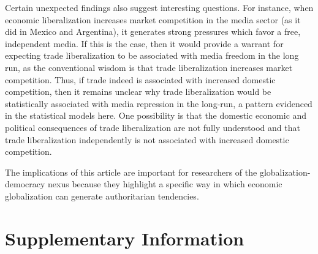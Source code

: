 \documentclass[12pt,a4paper]{article}\usepackage[]{graphicx}\usepackage[]{color}
\begin{document}
Certain unexpected findings also suggest interesting questions. For instance, when economic liberalization increases market competition in the media sector (as it did in Mexico and Argentina), it generates strong pressures which favor a free, independent media. If this is the case, then it would provide a warrant for expecting trade liberalization to be associated with media freedom in the long run, as the conventional wisdom is that trade liberalization increases market competition. Thus, if trade indeed is associated with increased domestic competition, then it remains unclear why trade liberalization would be statistically associated with media repression in the long-run, a pattern evidenced in the statistical models here. One possibility is that the domestic economic and political consequences of trade liberalization are not fully understood and that trade liberalization independently is not associated with increased domestic competition.

The implications of this article are important for researchers of the globalization-democracy nexus because they highlight a specific way in which economic globalization can generate authoritarian tendencies.


\pagebreak

\section{Supplementary Information}
\end{document}
